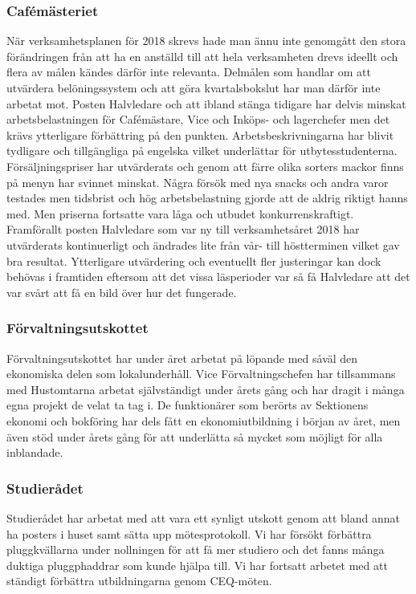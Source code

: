 \documentclass[../_main/handlingar.tex]{subfiles}
\begin{document}
\subsubsection*{Cafémästeriet}

När verksamhetsplanen för 2018 skrevs hade man ännu inte genomgått den stora förändringen från
att ha en anställd till att hela verksamheten drevs ideellt och flera av målen kändes därför inte
relevanta. Delmålen som handlar om att utvärdera belöningssystem och att göra kvartalsbokslut har
man därför inte arbetat mot. Posten Halvledare och att ibland stänga tidigare har delvis minskat
arbetsbelastningen för Cafémästare, Vice och Inköps- och lagerchefer men det krävs ytterligare
förbättring på den punkten. Arbetsbeskrivningarna har blivit tydligare och tillgängliga på engelska
vilket underlättar för utbytesstudenterna.
Försäljningspriser har utvärderats och genom att färre olika sorters mackor finns på menyn har
svinnet minskat. Några försök med nya snacks och andra varor testades men tidsbrist och hög
arbetsbelastning gjorde att de aldrig riktigt hanns med. Men priserna fortsatte vara låga och utbudet
konkurrenskraftigt.
Framförallt posten Halvledare som var ny till verksamhetsåret 2018 har utvärderats kontinuerligt och
ändrades lite från vår- till höstterminen vilket gav bra resultat. Ytterligare utvärdering och eventuellt
fler justeringar kan dock behövas i framtiden eftersom att det vissa läsperioder var så få Halvledare
att det var svårt att få en bild över hur det fungerade.

\subsubsection*{Förvaltningsutskottet}

Förvaltningsutskottet har under året arbetat på löpande med såväl den ekonomiska delen
som lokalunderhåll. Vice Förvaltningschefen har tillsammans med Hustomtarna arbetat
självständigt under årets gång och har dragit i många egna projekt de velat ta tag i. De
funktionärer som berörts av Sektionens ekonomi och bokföring har dels fått en
ekonomiutbildning i början av året, men även stöd under årets gång för att underlätta så
mycket som möjligt för alla inblandade.

\subsubsection*{Studierådet}

Studierådet har arbetat med att vara ett synligt utskott genom att bland annat ha posters i huset samt sätta upp mötesprotokoll. Vi har försökt förbättra pluggkvällarna under nollningen för att få mer studiero och det fanns många duktiga pluggphaddrar som kunde hjälpa till. Vi har fortsatt arbetet med att ständigt förbättra utbildningarna genom CEQ-möten.
\end{document}
